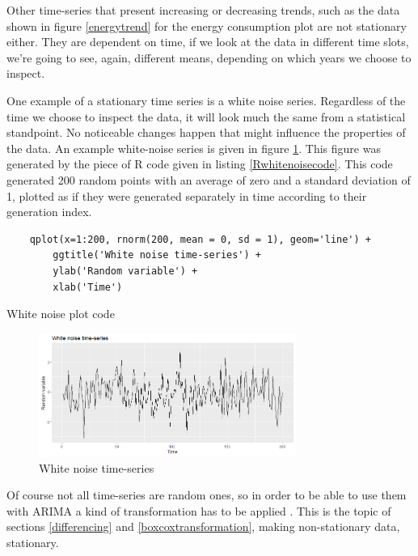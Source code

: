 \documentclass[12pt,a4paper,titlepage]{report}
\begin{document}
Other time-series that present increasing or decreasing trends, such as the data shown in figure \ref{energytrend} for the energy consumption plot are not stationary either. They are dependent on time, if we look at the data in different time slots, we're going to see, again, different means, depending on which years we choose to inspect.

One example of a stationary time series is a white noise series. Regardless of the time we choose to inspect the data, it will look much the same from a statistical standpoint. No noticeable changes happen that might influence the properties of the data. An example white-noise series is given in figure \ref{whitenoiseplot}. This figure was generated by the piece of R code given in listing \ref{Rwhitenoisecode}. This code generated 200 random points with an average of zero and a standard deviation of 1, plotted as if they were generated separately in time according to their generation index.

\begin{listing}[h]
    \begin{verbatim}
    qplot(x=1:200, rnorm(200, mean = 0, sd = 1), geom='line') +
        ggtitle('White noise time-series') + 
        ylab('Random variable') + 
        xlab('Time')
    \end{verbatim}
    
    \caption{White noise plot code}
    \label{Rwhitenoisecode}
\end{listing}

\begin{figure}[h]
    \centering
    \includegraphics[width=0.75\textwidth]{dwhitenoise}
    \caption{White noise time-series}
    \label{whitenoiseplot}
\end{figure}

Of course not all time-series are random ones, so in order to be able to use them with ARIMA a kind of transformation has to be applied . This is the topic of sections \ref{differencing} and \ref{boxcoxtransformation}, making non-stationary data, stationary.
\end{document}
